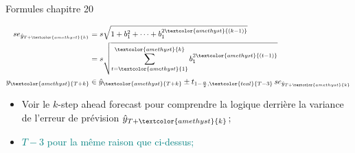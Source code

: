 \documentclass[12pt, titlepage, french]{report}
\begin{document}
\begin{FORMULA_SUMM}{Formules chapitre 20}
\setlength{\mathindent}{-1cm}
\begin{minipage}[ht]{0.5\linewidth}
\begin{align*}
	se_{\hat{y}_{T + \textcolor{amethyst}{k}}} 
		&= 	s \sqrt{1 + b_{1}^{2} + \dots + b_{1}^{2\textcolor{amethyst}{(k - 1)}}}	\\
		&=	s \sqrt{\sum_{t = \textcolor{amethyst}{1}}^{\textcolor{amethyst}{k}} b_{1}^{2\textcolor{amethyst}{(t - 1)}}}	\\
	y_{\textcolor{amethyst}{T + k}}
		&\in		\hat{y}_{\textcolor{amethyst}{T + k}} \pm	t_{1 - \frac{\alpha}{2}, \textcolor{teal}{T - 3}} \, se_{\hat{y}_{T + \textcolor{amethyst}{k}}}	
\end{align*}
\end{minipage}
\begin{minipage}[ht]{0.5\linewidth}
\begin{itemize}
	\item	\textcolor{amethyst}{Voir le $k$-step ahead forecast pour comprendre la logique derrière la variance de l'erreur de prévision $\hat{y}_{T + \textcolor{amethyst}{k}}$;}
	\item	\textcolor{teal}{$T - 3$ pour la même raison que ci-dessus;}
\end{itemize}
\end{minipage}
\setlength{\mathindent}{1cm}
\end{FORMULA_SUMM}
\end{document}
